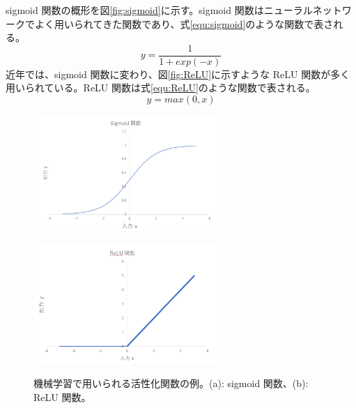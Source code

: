 sigmoid 関数の概形を図\ref{fig:sigmoid}に示す。sigmoid 関数はニューラルネットワークでよく用いられてきた関数であり、式\ref{equ:sigmoid}のような関数で表される。
\begin{equation}
    y = \frac{1}{1+exp(-x)}
    \label{equ:sigmoid}
\end{equation}
近年では、sigmoid 関数に変わり、図\ref{fig:ReLU}に示すような ReLU 関数が多く用いられている。ReLU 関数は式\ref{equ:ReLU}のような関数で表される。
\begin{equation}
    y = max(0,x)
    \label{equ:ReLU}
\end{equation}
\begin{figure}
    \centering
    \begin{minipage}[b]{0.4\linewidth}
        \centering
        \includegraphics[clip, width=7cm]{fig/4/sigmoid.png}
        \vspace{10pt}
        \subcaption{}
        \label{fig:sigmoid}
    \end{minipage}
    \hfill
    \begin{minipage}[b]{0.4\linewidth}
        \centering
        \includegraphics[clip, width=7cm]{fig/4/ReLU.png}
        \vspace{10pt}
        \subcaption{}
        \label{fig:ReLU}
    \end{minipage}
    \caption{機械学習で用いられる活性化関数の例。(a): sigmoid 関数、(b): ReLU 関数。}
    \label{fig:acctivation}
\end{figure}
